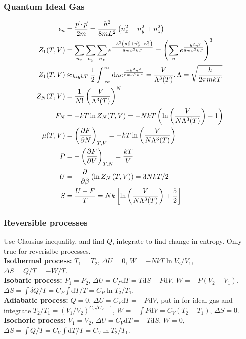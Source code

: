 \documentclass[a4paper, norsk, 8pt]{article}
\begin{document}
\begin{multicols*}{3}
\subsubsection*{\scriptsize Quantum Ideal Gas}
\begin{align*}
  \epsilon_n &= \frac{\vec{p}\cdot\vec{p}}{2m}  = \frac{h^2}{8mL^2}\left(n_x^2+n_y^2+n_z^2\right) \\
  Z_1(T,V) &= \sum_{n_x}\sum_{n_y}\sum_{n_z}e^{\frac{-h^2\left(n_x^2+n_y^2+n_z^2\right)}{8mL^2kT}} = \left( \sum_{n}e^{\frac{-h^2n^2}{8mL^2kT}} \right)^3 \\
  Z_1(T,V) &\approx_{high T} \frac{1}{2}\int_{-\infty}^{\infty}\mbox{d}n e^{\frac{-h^2n^2}{8mL^2kT}} = \frac{V}{\Lambda^3(T)}, \Lambda = \sqrt{\frac{h}{2\pi mkT}}\\
  Z_N(T,V) &= \frac{1}{N!}\left(\frac{V}{\Lambda^3(T)}\right)^N \\
  F_N &= -kT\ln{Z_N(T,V)} = -NkT\left( \ln{\left( \frac{V}{N\Lambda^3(T)}\right)} -1 \right)\\
  \mu(T,V) &= \left( \pdv{F}{N} \right)_{T,V} = -kT\ln{\left( \frac{V}{N\Lambda^3(T)} \right)} \\
  P &= -\left( \pdv{F}{V} \right)_{T,N} = \frac{kT}{V}\\
  U &= -\pdv{}{\beta}\left( \ln{Z_N\left(T, V\right)}\right) = 3NkT/2 \\
  S &= \frac{U-F}{T} = Nk\left[ \ln{\left( \frac{V}{N\Lambda^3(T)} \right)} + \frac{5}{2} \right]
\end{align*}


\subsubsection*{\scriptsize Reversible processes}
Use Clausius inequality, and find $Q$, integrate to find change in entropy. Only true for reverislbe processes.\\
\textbf{Isothermal process:} $T_1=T_2$, $\Delta U = 0$, $W=-NkT\ln{V_2/V_1}$, $\Delta S = Q/T = -W/T$. \\
\textbf{Isobaric process:} $P_1=P_2$, $\Delta U = C_P \mbox{d}T = T\mbox{d}S - P\mbox{d}V$, $W=-P\left(V_2-V_1\right)$, $\Delta S = \int \delta Q /T = C_P\int \mbox{d}T/T = C_P\ln{T_2/T_1}$. \\
\textbf{Adiabatic process:} $Q=0$, $\Delta U = C_V\mbox{d}T = -P\mbox{d}V$, put in for ideal gas and integrate $T_2/T_1=(V_1/V_2)^{C_P/C_V-1}$, $W=-\int P \mbox{d}V = C_V(T_2-T_1)$, $\Delta S = 0$. \\
\textbf{Isochoric process:} $V_1=V_2$, $\Delta U = C_V\mbox{d}T = -T\mbox{d}S$, $W=0$, $\Delta S = \int Q/T = C_V\int \mbox{d}T/T = C_V\ln{T_2/T_1}$. \\


\end{multicols*}
\end{document}
